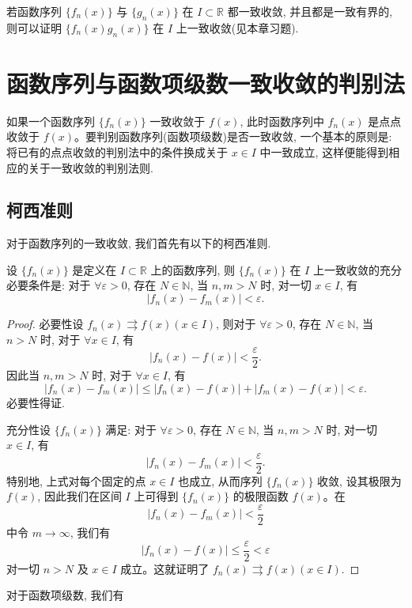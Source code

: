 若函数序列 $\{f_n(x)\}$ 与 $\{g_n(x)\}$ 在 $I\subset\mathbb R$ 都一致收敛, 并且都是一致有界的, 则可以证明 $\{f_n(x)g_n(x)\}$ 在 $I$ 上一致收敛(见本章习题).

\section{函数序列与函数项级数一致收敛的判别法}
\label{sec:ma-10-3}

如果一个函数序列 $\{f_n(x)\}$ 一致收敛于 $f(x)$, 此时函数序列中 $f_n(x)$ 是点点收敛于 $f(x)$。要判别函数序列(函数项级数)是否一致收敛, 一个基本的原则是: 将已有的点点收敛的判别法中的条件换成关于 $x\in I$ 中一致成立, 这样便能得到相应的关于一致收敛的判别法则.

\subsection{柯西准则}
\label{subsec:ma-10-3-1}

对于函数序列的一致收敛, 我们首先有以下的柯西准则.

\begin{theorem}[{柯西准则}]\label{theorem:ma-10-3-1}
设 $\{f_n(x)\}$ 是定义在 $I\subset\mathbb R$ 上的函数序列, 则 $\{f_n(x)\}$ 在 $I$ 上一致收敛的充分必要条件是: 对于 $\forall\varepsilon>0$, 存在 $N\in\mathbb N$, 当 $n,m>N$ 时, 对一切 $x\in I$, 有
\[
  |f_n(x)-f_m(x)|<\varepsilon.
\]
\end{theorem}


\begin{proof}
必要性\quad 设 $f_n(x)\rightrightarrows f(x)(x\in I)$, 则对于 $\forall\varepsilon>0$, 存在 $N\in\mathbb N$, 当 $n>N$ 时, 对于 $\forall x\in I$, 有
\[
  |f_n(x)-f(x)|<\frac\varepsilon2.
\]
因此当 $n,m>N$ 时, 对于 $\forall x\in I$, 有
\[
  |f_n(x)-f_m(x)|\leq |f_n(x)-f(x)|+|f_m(x)-f(x)|<\varepsilon.
\]
必要性得证.

充分性\quad 设 $\{f_n(x)\}$ 满足: 对于 $\forall\varepsilon>0$, 存在 $N\in\mathbb N$, 当 $n,m>N$ 时, 对一切 $x\in I$, 有
\[
  |f_n(x)-f_m(x)|<\frac\varepsilon2.
\]
特别地, 上式对每个固定的点 $x\in I$ 也成立, 从而序列 $\{f_n(x)\}$ 收敛, 设其极限为 $f(x)$, 因此我们在区间 $I$ 上可得到 $\{f_n(x)\}$ 的极限函数 $f(x)$。在
\[
  |f_n(x)-f_m(x)|<\frac\varepsilon2
\]
中令 $m\to\infty$, 我们有
\[
  |f_n(x)-f(x)|\leq\frac\varepsilon2<\varepsilon
\]
对一切 $n>N$ 及 $x\in I$ 成立。这就证明了 $f_n(x)\rightrightarrows f(x)(x\in I)$.
\end{proof}


对于函数项级数, 我们有

